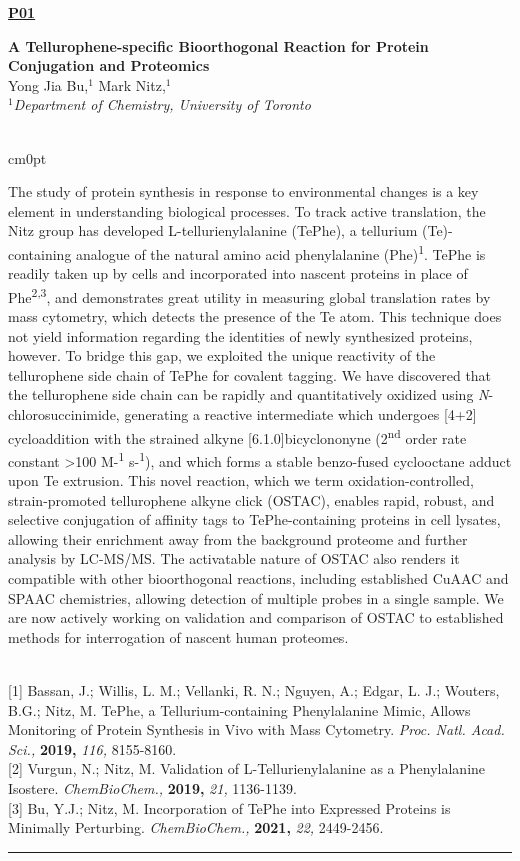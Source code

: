\documentclass[titlepage,oneside,openany,10pt]{book}
\newenvironment{posterabswrefwfig}[8] %
        {
        \newcommand{\posterref}{#5}
	\FPeval{\cutw}{clip(16.7-#7)}
	\FPeval{\cutl}{round(#8/0.35+1,3)}
	\begin{flushright}
                \underline{\textbf{#4}}
        \end{flushright}
        \textbf{#1}\\%
        #2\\%
        \textit{#3}\\\\%
        \def\windowpagestuff{\centering
                \texttt{[image: \#6]}
	}
        \opencutright
        \begin{cutout}{0}{\cutw cm}{0pt}{\RoundingUpFunction{\cutl}}
        \noindent
	}
	{
	\end{cutout}
	\vspace{0.5cm}
	\\\noindent \posterref \\ \noindent\rule{15cm}{0.5pt}%
        }
\begin{document}
\begin{posterabswrefwfig}
	{A Tellurophene-specific Bioorthogonal Reaction for Protein Conjugation and Proteomics}
	{Yong Jia Bu,$^{1}$ Mark Nitz,$^{1}$}
	{
	$^1$Department of Chemistry, University of Toronto
	}
	{P01}
	{
	{[1]} Bassan, J.; Willis, L. M.; Vellanki, R. N.; Nguyen, A.; Edgar, L. J.; Wouters, B.G.; Nitz, M. TePhe, a Tellurium-containing Phenylalanine Mimic, Allows Monitoring of Protein Synthesis in Vivo with Mass Cytometry. \emph{Proc. Natl. Acad. Sci.,}  \textbf{2019,}  \emph{116,} 8155-8160.\\
	{[2]} Vurgun, N.; Nitz, M. Validation of L-Tellurienylalanine as a Phenylalanine Isostere. \emph{ChemBioChem.,}  \textbf{2019,}  \emph{21,} 1136-1139.\\
	{[3]} Bu, Y.J.; Nitz, M. Incorporation of TePhe into Expressed Proteins is Minimally Perturbing. \emph{ChemBioChem.,}  \textbf{2021,}  \emph{22,} 2449-2456.
	}
	{abstract_figures/Bu_Yong Jia_Poster.jpg}
	{10.0}
	{4.0}
	The study of protein synthesis in response to environmental changes is a key element in understanding biological processes. To track active translation, the Nitz group has developed L-tellurienylalanine (TePhe), a tellurium (Te)-containing analogue of the natural amino acid phenylalanine (Phe)\textsuperscript{1}. TePhe is readily taken up by cells and incorporated into nascent proteins in place of Phe\textsuperscript{2,3}, and demonstrates great utility in measuring global translation rates by mass cytometry, which detects the presence of the Te atom. This technique does not yield information regarding the identities of newly synthesized proteins, however. To bridge this gap, we exploited the unique reactivity of the tellurophene side chain of TePhe for covalent tagging. We have discovered that the tellurophene side chain can be rapidly and quantitatively oxidized using \emph{N}-chlorosuccinimide, generating a reactive intermediate which undergoes {[}4+2{]} cycloaddition with the strained alkyne {[}6.1.0{]}bicyclononyne (2\textsuperscript{nd} order rate constant \textgreater{}100 M-\textsuperscript{1} s-\textsuperscript{1}), and which forms a stable benzo-fused cyclooctane adduct upon Te extrusion. This novel reaction, which we term oxidation-controlled, strain-promoted tellurophene alkyne click (OSTAC), enables rapid, robust, and selective conjugation of affinity tags to TePhe-containing proteins in cell lysates, allowing their enrichment away from the background proteome and further analysis by LC-MS/MS. The activatable nature of OSTAC also renders it compatible with other bioorthogonal reactions, including established CuAAC and SPAAC chemistries, allowing detection of multiple probes in a single sample. We are now actively working on validation and comparison of OSTAC to established methods for interrogation of nascent human proteomes.
	\label{BuY}
\end{posterabswrefwfig}
\end{document}
